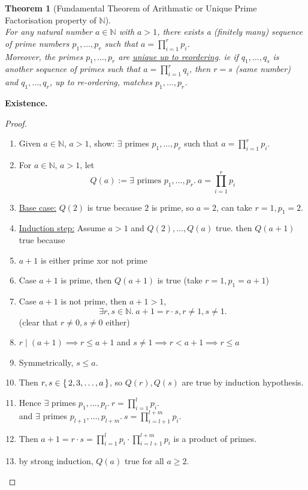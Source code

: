 \documentclass[12pt]{article}
\newenvironment{prf}
{
    \begin{proof}
        \hfill
        \begin{enumerate}[label*=\arabic*.]
                }
                {
                \hfill\qedsymbol
        \end{enumerate}
    \renewcommand{\qedsymbol}{}
    \end{proof}
}
\newcounter{dummy} \numberwithin{dummy}{section}
\numberwithin{equation}{dummy}
\newtheorem{theorem}[dummy]{Theorem}
\theoremstyle{definition}
\newcommand{\nat}{\mathbb{N}}
\begin{document}
\newpage
\begin{theorem}[Fundamental Theorem of Arithmatic or Unique Prime Factorisation property of $\nat$] \hfill\\
    For any natural number $a\in\nat$ with $a>1$, there exists a (finitely many) sequence of prime numbers
    $p_1,\dots,p_r$ such that $a = \prod\limits_{i=1}^{r} p_i$.\\
    Moreover, the primes $p_1,\dots,p_r$ are \underline{unique up to reordering}.
    ie if $q_1,\dots,q_s$ is another sequence of primes such that $a = \prod\limits_{i=1}^{r} q_i$, then $r = s$ (same number) and $q_1,\dots,q_r$, up to re-ordering, matches $p_1,\dots,p_r$.
\end{theorem}
\textbf{Existence.}
\begin{prf}
\item Given $a\in\nat$, $a>1$, show: $\exists$ primes $p_1,\dots,p_r$ such that $a = \prod\limits_{i=1}^{r} p_i$.
\item For $a\in\nat$, $a>1$, let
    $$Q(a) := \exists\text{ primes }p_1,\dots,p_r.~ a = \prod_{i=1}^{r} p_i$$
\item \underline{Base case:} $Q(2)$ is true because $2$ is prime, so $a=2$, can take $r=1, p_1=2$.
\item \underline{Induction step:} Assume $a>1$ and $Q(2), \dots, Q(a)$ true. then $Q(a+1)$ true because
\item $a+1$ is either prime xor not prime
\item Case $a+1$ is prime, then $Q(a+1)$ is true (take $r=1, p_1=a+1$)
\item Case $a+1$ is not prime, then $a+1>1$,
    $$\exists r,s\in\nat.~ a+1 = r\cdot s, r\ne 1, s\ne 1.$$
    (clear that $r \ne 0, s \ne 0$ either)
\item $r\mid (a+1) \implies r \leq a+1$ and $s\ne 1 \implies r < a+1\implies r\leq a$
\item Symmetrically, $s\leq a$.
\item Then $r,s \in \set{2,3,\dots,a}$, so $Q(r),Q(s)$ are true by induction hypothesis.
\item Hence $\exists$ primes $p_1,\dots,p_l.~ r = \prod\limits_{i=1}^{l} p_i$.\\
    and $\exists$ primes $p_{l+1},\dots,p_{l+m}.~ s = \prod\limits_{i=l+1}^{l+m} p_i$.
\item Then $a+1 = r\cdot s = \prod\limits_{i=1}^{l} p_i \cdot \prod\limits_{i=l+1}^{l+m} p_i$ is a product of primes.
\item by strong induction, $Q(a)$ true for all $a \geq 2$.
\end{prf}
\end{document}
